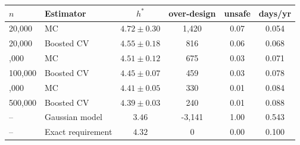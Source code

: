 \begin{tabular}{@{}llcccc@{}}
\toprule
$n$ & Estimator & $h^*$ & over-design & unsafe & days/yr\\
\midrule
20,000 & MC & $4.72\pm0.30$ & 1,420 & 0.07 & 0.054\\
20,000 & Boosted CV & $4.55\pm0.18$ & 816 & 0.06 & 0.068\\
\addlinespace[1pt]
100,000 & MC & $4.51\pm0.12$ & 675 & 0.03 & 0.071\\
100,000 & Boosted CV & $4.45\pm0.07$ & 459 & 0.03 & 0.078\\
\addlinespace[1pt]
500,000 & MC & $4.41\pm0.05$ & 330 & 0.01 & 0.084\\
500,000 & Boosted CV & $4.39\pm0.03$ & 240 & 0.01 & 0.088\\
\midrule
-- & Gaussian model & $3.46$ & -3,141 & 1.00 & 0.543\\
-- & Exact requirement & $4.32$ & 0 & 0.00 & 0.100\\
\bottomrule
\end{tabular}
